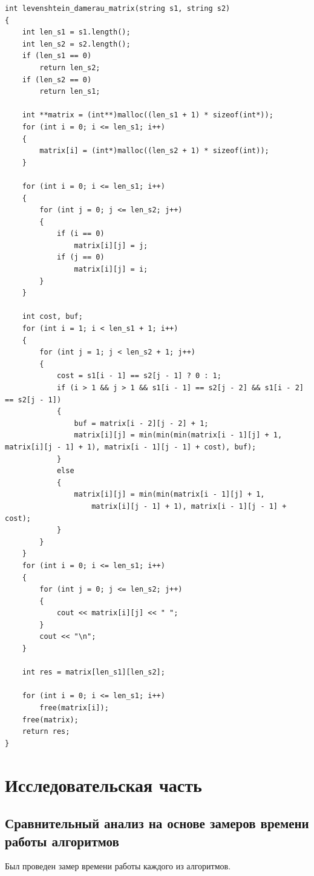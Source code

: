 \documentclass[12pt]{report}
\begin{document}
\begin{lstlisting}[label=some-code,caption=Функция нахождения расстояния Дамерау-Левенштейна матрично]
int levenshtein_damerau_matrix(string s1, string s2)
{
	int len_s1 = s1.length();
	int len_s2 = s2.length();
	if (len_s1 == 0)
		return len_s2;
	if (len_s2 == 0)
		return len_s1;

	int **matrix = (int**)malloc((len_s1 + 1) * sizeof(int*));
	for (int i = 0; i <= len_s1; i++) 
	{
		matrix[i] = (int*)malloc((len_s2 + 1) * sizeof(int));
	}

	for (int i = 0; i <= len_s1; i++)
	{
		for (int j = 0; j <= len_s2; j++)
		{
			if (i == 0)
				matrix[i][j] = j;
			if (j == 0)
				matrix[i][j] = i;
		}
	}

	int cost, buf;
	for (int i = 1; i < len_s1 + 1; i++)
	{
		for (int j = 1; j < len_s2 + 1; j++)
		{
			cost = s1[i - 1] == s2[j - 1] ? 0 : 1;
			if (i > 1 && j > 1 && s1[i - 1] == s2[j - 2] && s1[i - 2] == s2[j - 1])
			{
				buf = matrix[i - 2][j - 2] + 1;
				matrix[i][j] = min(min(min(matrix[i - 1][j] + 1, matrix[i][j - 1] + 1), matrix[i - 1][j - 1] + cost), buf);
			}
			else
			{
				matrix[i][j] = min(min(matrix[i - 1][j] + 1,
					matrix[i][j - 1] + 1), matrix[i - 1][j - 1] + cost);
			}
		}
	}
	for (int i = 0; i <= len_s1; i++)
	{
		for (int j = 0; j <= len_s2; j++)
		{
			cout << matrix[i][j] << " ";
		}
		cout << "\n";
	}

	int res = matrix[len_s1][len_s2];

	for (int i = 0; i <= len_s1; i++)
		free(matrix[i]);
	free(matrix);
	return res;
}
\end{lstlisting}


\chapter{Исследовательская часть}

\section{Сравнительный анализ на основе замеров времени работы алгоритмов}

Был проведен замер времени работы каждого из алгоритмов.
\end{document}
